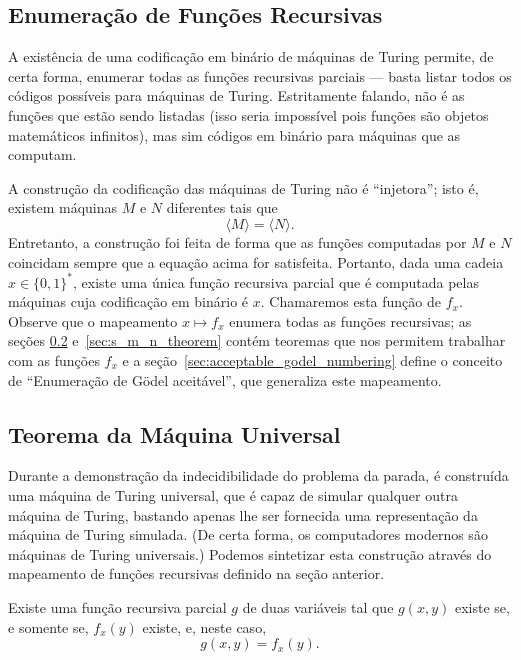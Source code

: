 \subsection{Enumeração de Funções Recursivas}

A existência de uma codificação em binário de máquinas de Turing
permite, de certa forma,
enumerar todas as funções recursivas parciais
--- basta listar todos os códigos possíveis para máquinas de Turing.
Estritamente falando,
não é as funções que estão sendo listadas
(isso seria impossível pois funções são objetos matemáticos infinitos),
mas sim códigos em binário para máquinas que as computam.

A construção da codificação das máquinas de Turing não é ``injetora'';
isto é, existem máquinas $M$ e $N$ diferentes
tais que
\begin{equation*}
    \langle M \rangle = \langle N \rangle.
\end{equation*}
Entretanto,
a construção foi feita de forma que
as funções computadas por $M$ e $N$ coincidam
sempre que a equação acima for satisfeita.
Portanto,
dada uma cadeia $x \in \{0, 1\}^*$,
existe uma única função recursiva parcial
que é computada pelas máquinas cuja codificação em binário é $x$.
Chamaremos esta função de $f_x$.
Observe que o mapeamento $x \mapsto f_x$
enumera todas as funções recursivas;
as seções \ref{sec:universal_turing_machine} e~\ref{sec:s_m_n_theorem}
contém teoremas que nos permitem trabalhar com as funções $f_x$
e a seção~\ref{sec:acceptable_godel_numbering}
define o conceito de ``Enumeração de Gödel aceitável'',
que generaliza este mapeamento.

\subsection{Teorema da Máquina Universal}
\label{sec:universal_turing_machine}

Durante a demonstração da indecidibilidade do problema da parada,
é construída uma máquina de Turing universal,
que é capaz de simular qualquer outra máquina de Turing,
bastando apenas lhe ser fornecida uma representação da máquina de Turing simulada.
(De certa forma,
os computadores modernos são máquinas de Turing universais.)
Podemos sintetizar esta construção através do mapeamento de funções recursivas
definido na seção anterior.

\begin{theorem}
    Existe uma função recursiva parcial $g$ de duas variáveis tal que
    $g(x, y)$ existe se, e somente se, $f_x(y)$ existe,
    e, neste caso,
    \begin{equation*}
        g(x, y) = f_x(y).
    \end{equation*}
\end{theorem}

